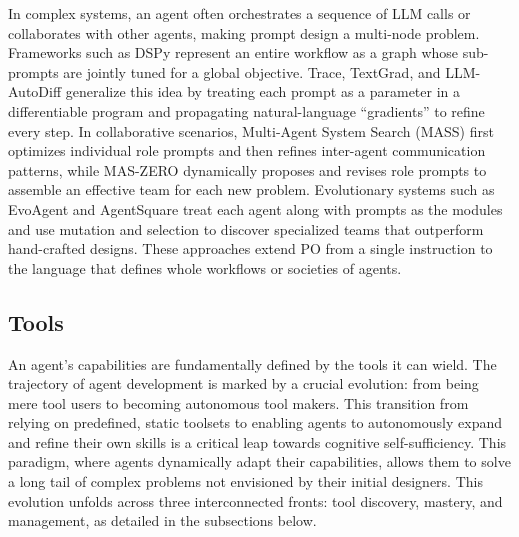 In complex systems, an agent often orchestrates a sequence of LLM calls or collaborates with other agents, making prompt design a multi-node problem. Frameworks such as DSPy represent an entire workflow as a graph whose sub-prompts are jointly tuned for a global objective\citep{khattab2023dspy}. Trace\citep{wang2023trace}, TextGrad\citep{yellamraju2024textgrad}, and LLM-AutoDiff\citep{yin2025llm} generalize this idea by treating each prompt as a parameter in a differentiable program and propagating natural-language “gradients” to refine every step. In collaborative scenarios, Multi-Agent System Search (MASS)\citep{zhou2025maasprompt} first optimizes individual role prompts and then refines inter-agent communication patterns, while MAS-ZERO\citep{ke2025maszero} dynamically proposes and revises role prompts to assemble an effective team for each new problem. Evolutionary systems such as EvoAgent\citep{yuan2024evoagent} and AgentSquare\citep{shang2025agentsquare} treat each agent along with prompts as the modules and use mutation and selection to discover specialized teams that outperform hand-crafted designs. These approaches extend PO from a single instruction to the language that defines whole workflows or societies of agents.



\subsection{Tools}


An agent's capabilities are fundamentally defined by the tools it can wield. The trajectory of agent development is marked by a crucial evolution: from being mere tool users to becoming autonomous tool makers. This transition from relying on predefined, static toolsets to enabling agents to autonomously expand and refine their own skills is a critical leap towards cognitive self-sufficiency. This paradigm, where agents dynamically adapt their capabilities, allows them to solve a long tail of complex problems not envisioned by their initial designers. This evolution unfolds across three interconnected fronts: tool discovery, mastery, and management, as detailed in the subsections below.

